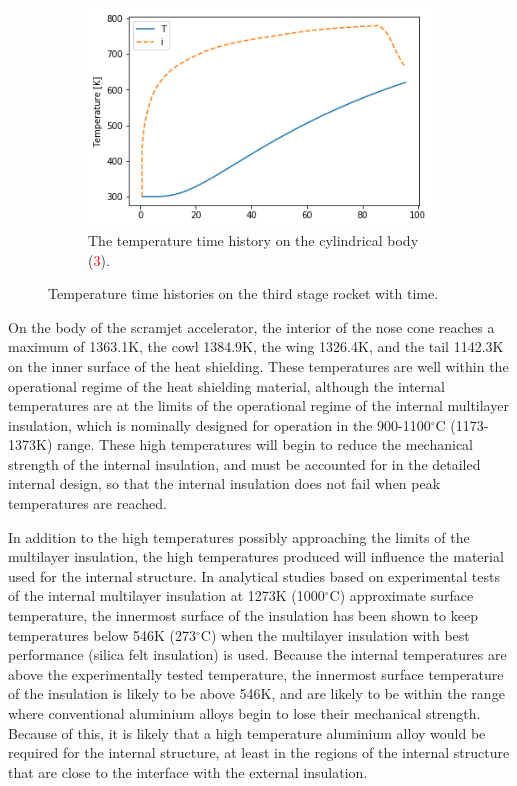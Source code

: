 \begin{figure}[!ht]
	\begin{subfigure}{.495\textwidth}
		\centering
		\includegraphics[width=0.99\linewidth]{figures/A1_uncertainty-analysis/T3Body}
		\caption{The temperature time history on the cylindrical body (\textcolor{red}{3}).}
		
	\end{subfigure}
	
	\caption{Temperature time histories on the third stage rocket with time. }
	\label{fig:TrajTemp3}
\end{figure}

On the body of the scramjet accelerator, the interior of the nose cone reaches a maximum of 1363.1K, the cowl 1384.9K, the wing 1326.4K, and the tail 1142.3K on the inner surface of the heat shielding.
These temperatures are well within the operational regime of the heat shielding material, although the internal temperatures are at the limits of the operational regime of the internal multilayer insulation, which is nominally designed for operation in the 900-1100$^\circ$C (1173-1373K) range. These high temperatures will begin to reduce the mechanical strength of the internal insulation\cite{Kourtides}, and must be accounted for in the detailed internal design, so that the internal insulation does not fail when peak temperatures are reached. 

In addition to the high temperatures possibly approaching the limits of the multilayer insulation, the high temperatures produced will influence the material used for the internal structure. 
In analytical studies based on experimental tests of the internal multilayer insulation at 1273K (1000$^\circ$C) approximate surface temperature, the innermost surface of the insulation has been shown to keep temperatures below 546K (273$^\circ$C)\cite{Kourtides} when the multilayer insulation with best performance (silica felt insulation\cite{Kourtides}) is used. Because the internal temperatures are above the experimentally tested temperature, the innermost surface temperature of the insulation is likely to be above 546K, and are likely to be within the range where conventional aluminium alloys begin to lose their mechanical strength. Because of this, it is likely that a high temperature aluminium alloy would be required for the internal structure, at least in the regions of the internal structure that are close to the interface with the external insulation.

